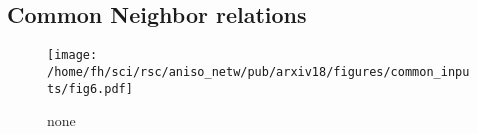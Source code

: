 \clearpage
\pagebreak
\newpage

\subsection*{Common Neighbor relations}


\begin{figure}[h!]
  \centering
  \texttt{[image: /home/fh/sci/rsc/aniso\_netw/pub/arxiv18/figures/common\_inputs/fig6.pdf]}
\caption{none}
\label{fig:cnb}
\end{figure}

